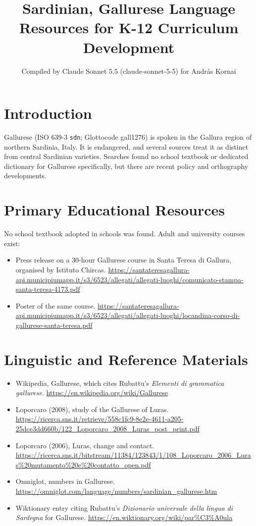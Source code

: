 \documentclass[12pt]{article}
\title{Sardinian, Gallurese Language Resources for K-12 Curriculum Development}
\author{Compiled by Claude Sonnet 5.5 (claude-sonnet-5-5) for Andr\'as Kornai}
\date{}
\begin{document}
\maketitle

\section{Introduction}
Gallurese (ISO 639-3 \texttt{sdn}; Glottocode gall1276) is spoken in the Gallura region of northern Sardinia, Italy. It is endangered, and several sources treat it as distinct from central Sardinian varieties. Searches found no school textbook or dedicated dictionary for Gallurese specifically, but there are recent policy and orthography developments.

\section{Primary Educational Resources}
No school textbook adopted in schools was found. Adult and university courses exist:
\begin{itemize}
\item Press release on a 30-hour Gallurese course in Santa Teresa di Gallura, organised by Istituto Chircas. \url{https://santateresagallura-api.municipiumapp.it/s3/6523/allegati/allegati-luoghi/comunicato-stampa-santa-teresa-4173.pdf}
\item Poster of the same course. \url{https://santateresagallura-api.municipiumapp.it/s3/6523/allegati/allegati-luoghi/locandina-corso-di-gallurese-santa-teresa.pdf}
\end{itemize}

\section{Linguistic and Reference Materials}
\begin{itemize}
\item Wikipedia, Gallurese, which cites Rubattu's \emph{Elementi di grammatica gallurese}. \url{https://en.wikipedia.org/wiki/Gallurese}
\item Loporcaro (2008), study of the Gallurese of Luras. \url{https://ricerca.sns.it/retrieve/558c1fc9-8e2e-4611-a205-25dce3dd660b/122_Loporcaro_2008_Luras_post_print.pdf}
\item Loporcaro (2006), Luras, change and contact. \url{https://ricerca.sns.it/bitstream/11384/123843/1/108_Loporcaro_2006_Luras%20mutamento%20e%20contatto_open.pdf}
\item Omniglot, numbers in Gallurese. \url{https://omniglot.com/language/numbers/sardinian_gallurese.htm}
\item Wiktionary entry citing Rubattu's \emph{Dizionario universale della lingua di Sardegna} for Gallurese. \url{https://en.wiktionary.org/wiki/par%C3%A0ula}
\end{itemize}
\end{document}
